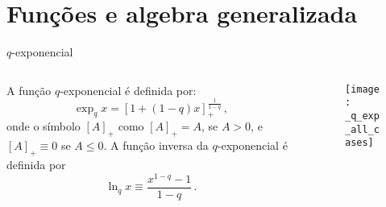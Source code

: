\documentclass{beamer}
\begin{document}

\section{Funções e algebra generalizada}

\begin{frame}{$q$-exponencial}
	\begin{columns}
		\begin{column}{5cm}
A função $q$-exponencial é definida por:
%
\begin{equation}
\label{eq:qexp}
 \exp_q x = [1+(1-q)x]_+^{\frac{1}{1-q}}\nonumber \,,
\end{equation}
%
onde o símbolo $[A]_+$ como $[A]_+=A$,  se $A>0$, e $[A]_+\equiv0$ se $A\le0$.
A função inversa da $q$-exponencial é definida por 
%
\begin{equation}
\label{eq:qlogc2}
 \ln_q x \equiv \frac{x^{1-q}-1}{1-q} \nonumber\,.
\end{equation}
	\end{column}
	\begin{column}{5cm}
           \begin{figure}
            \texttt{[image: \_q\_exp\_all\_cases]}
	   \end{figure}
	\end{column}
\end{columns}
\end{frame}
\end{document}
